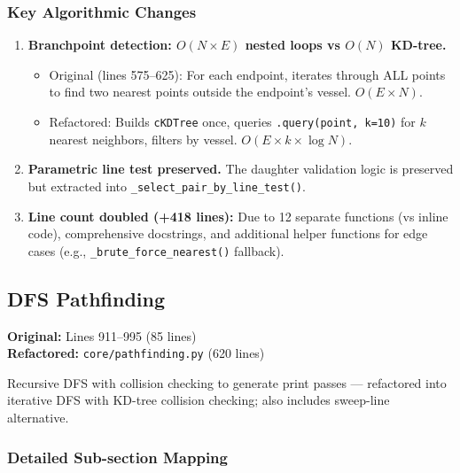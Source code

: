 \documentclass[11pt,letterpaper]{article}
\newcommand{\code}[1]{\texttt{#1}}
\begin{document}
\subsubsection{Key Algorithmic Changes}

\begin{enumerate}
    \item \textbf{Branchpoint detection: $O(N \times E)$ nested loops vs $O(N)$ KD-tree.}
    \begin{itemize}
        \item Original (lines 575--625): For each endpoint, iterates through ALL points to find two nearest points outside the endpoint's vessel. $O(E \times N)$.
        \item Refactored: Builds \code{cKDTree} once, queries \code{.query(point, k=10)} for $k$ nearest neighbors, filters by vessel. $O(E \times k \times \log N)$.
    \end{itemize}

    \item \textbf{Parametric line test preserved.} The daughter validation logic is preserved but extracted into \code{\_select\_pair\_by\_line\_test()}.

    \item \textbf{Line count doubled (+418 lines):} Due to 12 separate functions (vs inline code), comprehensive docstrings, and additional helper functions for edge cases (e.g., \code{\_brute\_force\_nearest()} fallback).
\end{enumerate}

\subsection{DFS Pathfinding}

\textbf{Original:} Lines 911--995 (85 lines)\\
\textbf{Refactored:} \code{core/pathfinding.py} (620 lines)

Recursive DFS with collision checking to generate print passes --- refactored into iterative DFS with KD-tree collision checking; also includes sweep-line alternative.

\subsubsection{Detailed Sub-section Mapping}
\end{document}
